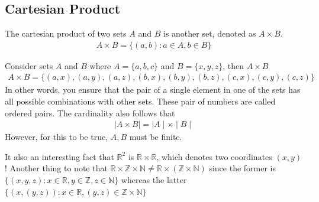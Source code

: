 \documentclass[a4paper]{article}
\theoremstyle{plain}
\theoremstyle{definition}
\newtheorem{defn}{Definition}[section]
\newtheorem{exmp}{Example}[section]
\theoremstyle{remark}
\begin{document}
\subsection{Cartesian Product}
\begin{tcolorbox}[colback=black!3!white,colframe=black!60!white,title=\begin{defn}Cartesian Product \label{Cartesian Product}\end{defn}]
The cartesian product of two sets $A$ and $B$ is another set, denoted as $A \times B$.
\begin{align}
	A \times B = \{(a,b):a \in A, b \in B\}
\end{align}
\end{tcolorbox}
\begin{tcolorbox}[colback=black!3!white,colframe=black!60!white,title=\begin{exmp}Cartesian Product Example \label{Cartesian Product Example}\end{exmp}]
Consider sets $A$ and $B$ where $A=\{a,b,c\}$ and $B=\{x,y,z\}$, then $A \times B$
\begin{align}
	A \times B = \{(a,x),(a,y),(a,z),(b,x),(b,y),(b,z),(c,x),(c,y),(c,z)\}
\end{align}
In other words, you ensure that the pair of a single element in one of the sets has all possible combinations with other sets. These pair of numbers are called ordered pairs. The cardinality also follows that
\begin{align}
	\mid A \times B \mid =  \mid A \mid \times  \mid B \mid 
\end{align}
However, for this to be true, $A,B$ must be finite.
\end{tcolorbox}
It also an interesting fact that $\mathbb{R}^{2}$ is $\mathbb{R} \times \mathbb{R}$, which denotes two coordinates $(x,y)$ ! Another thing to note that $\mathbb{R} \times \mathbb{Z} \times \mathbb{N} \neq \mathbb{R} \times (\mathbb{Z} \times \mathbb{N})$ since the former is $\{(x,y,z): x \in \mathbb{R}, y \in \mathbb{Z}, z \in \mathbb{N}\}$ whereas the latter $\{(x,(y,z)):x \in \mathbb{R}, (y,z) \in \mathbb{Z}\times \mathbb{N}\}$
\end{document}
